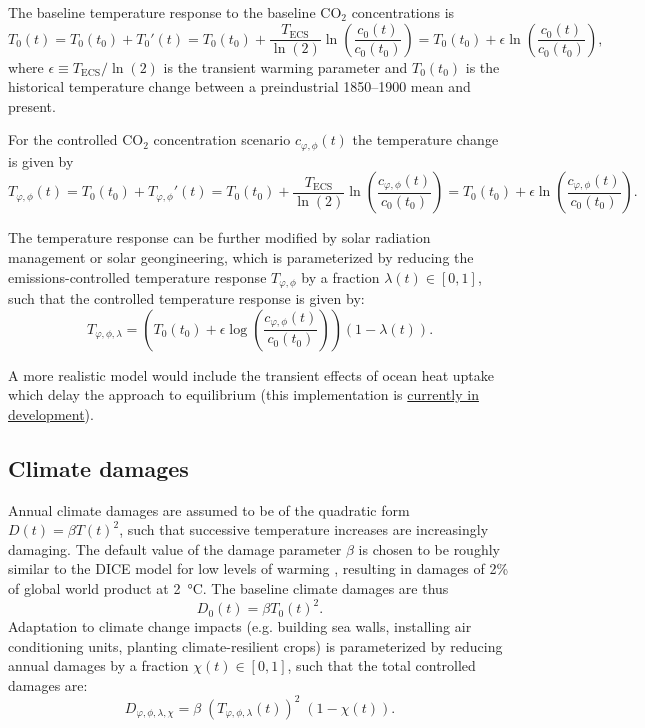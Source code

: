 \documentclass{article}
\begin{document}
The baseline temperature response to the baseline CO$_{2}$ concentrations is 
\begin{equation}
    T_{0}(t) = T_{0}(t_{0}) + T_{0}'(t) =  
    T_{0}(t_{0}) + 
    \frac{T_{\text{ECS}}}{\ln(2)} \ln(\frac{c_{0}(t)}{c_{0}(t_{0})}) = 
    T_{0}(t_{0}) + 
    \epsilon \ln(\frac{c_{0}(t)}{c_{0}(t_{0})}),
\end{equation}
where $\epsilon \equiv T_{\text{ECS}} / \ln(2)$ is the transient warming parameter and $T_{0}(t_{0})$ is the historical temperature change between a preindustrial 1850–1900 mean and present.

For the controlled CO$_{2}$ concentration scenario $c_{\varphi,\phi}(t)$ the temperature change is given by
\begin{equation}
    T_{\varphi,\phi}(t) = T_{0}(t_{0}) + T_{\varphi, \phi}'(t) =
    T_{0}(t_{0}) + 
    \frac{T_{\text{ECS}}}{\ln(2)} \ln(\frac{c_{\varphi,\phi}(t)}{c_{0}(t_{0})}) = 
    T_{0}(t_{0}) + 
    \epsilon \ln(\frac{c_{\varphi,\phi}(t)}{c_{0}(t_{0})}).
\end{equation}


The temperature response can be further modified by solar radiation management or solar geongineering, which is parameterized by reducing the emissions-controlled temperature response $T_{\varphi,\phi}$ by a fraction $\lambda(t) \in [0,1]$, such that the controlled temperature response is given by:
\begin{equation}
    T_{\varphi, \phi, \lambda} = \left(
    T_{0}(t_{0}) + 
    \epsilon \log(\frac{c_{\varphi,\phi}(t)}{c_{0}(t_{0})}) 
    \right) (1 - \lambda(t)).
\end{equation}

A more realistic model would include the transient effects of ocean heat uptake which delay the approach to equilibrium \citep{Held2014} (this implementation is \textcolor{blue}{\href{https://github.com/hdrake/OptimizeClimate/tree/two-box-temperature}{currently in development}}).

\subsection{Climate damages}

Annual climate damages are assumed to be of the quadratic form $D(t) = \beta T(t)^{2}$, such that successive temperature increases are increasingly damaging. The default value of the damage parameter $\beta$ is chosen to be roughly similar to the DICE model for low levels of warming \citep{Nordhaus}, resulting in damages of 2\% of global world product at \SI{2}{\celsius}. The baseline climate damages are thus
\begin{equation}
    D_{0}(t) = \beta T_{0}(t)^{2}.
\end{equation}
Adaptation to climate change impacts (e.g. building sea walls, installing air conditioning units, planting climate-resilient crops) is parameterized by reducing annual damages by a fraction $\chi(t) \in [0,1]$, such that the total controlled damages are:
\begin{equation}
    D_{\varphi, \phi, \lambda, \chi} = \beta \; (T_{\varphi, \phi, \lambda}(t))^{2} \; (1-\chi(t)).
\end{equation}
\end{document}
